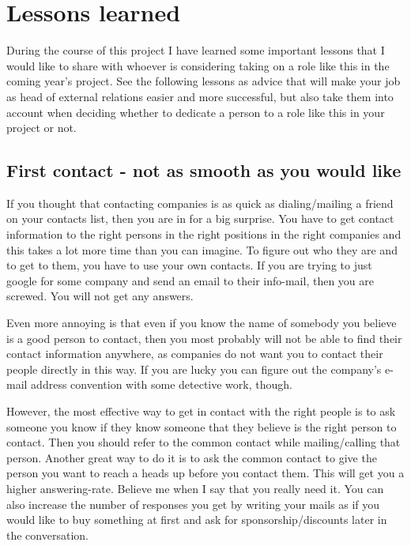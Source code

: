 \section{Lessons learned}\label{sec:lessons_learned}
During the course of this project I have learned some important lessons that I would like to share with whoever is considering taking on a role like this in the coming year's project. See the following lessons as advice that will make your job as head of external relations easier and more successful, but also take them into account when deciding whether to dedicate a person to a role like this in your project or not.

\subsection{First contact - not as smooth as you would like}
If you thought that contacting companies is as quick as dialing/mailing a friend on your contacts list, then you are in for a big surprise. You have to get contact information to the right persons in the right positions in the right companies and this takes a lot more time than you can imagine. To figure out who they are and to get to them, you have to use your own contacts. If you are trying to just google for some company and send an email to their info-mail, then you are screwed. You will not get any answers. 

Even more annoying is that even if you know the name of somebody you believe is a good person to contact, then you most probably will not be able to find their contact information anywhere, as companies do not want you to contact their people directly in this way. If you are lucky you can figure out the company's e-mail address convention with some detective work, though. 

However, the most effective way to get in contact with the right people is to ask someone you know if they know someone that they believe is the right person to contact. Then you should refer to the common contact while mailing/calling that person. Another great way to do it is to ask the common contact to give the person you want to reach a heads up before you contact them. This will get you a higher answering-rate. Believe me when I say that you really need it. You can also increase the number of responses you get by writing your mails as if you would like to buy something at first and ask for sponsorship/discounts later in the conversation. 

